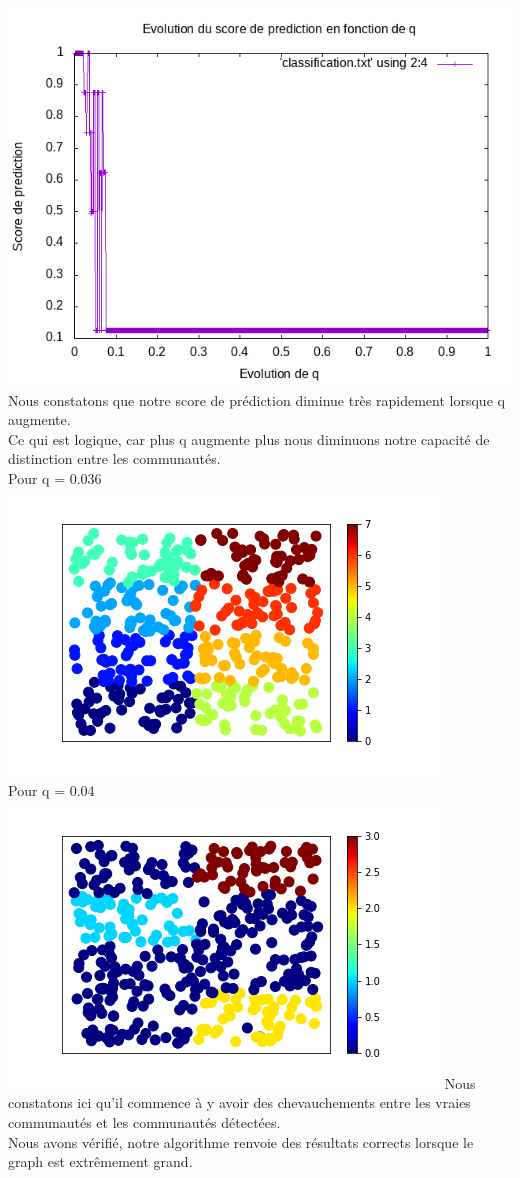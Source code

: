 \documentclass[a4paper,10pt]{report}
\begin{document}
 \includegraphics[scale=0.6]{Datas/classificationp05scorelabelpropagation.png}
Nous constatons que notre score de prédiction diminue très rapidement lorsque q augmente. 
\\
Ce qui est logique, car plus q augmente plus nous diminuons notre capacité de distinction entre les communautés.
\\
Pour q = 0.036
\\
\includegraphics[scale=0.6]{Datas/colorLabelPropagation036.png}
\\
Pour q = 0.04
\\
\includegraphics[scale=0.6]{Datas/colorLabelPropagation040.png}
Nous constatons ici qu'il commence à y avoir des chevauchements entre les vraies communautés et les communautés détectées.
\\
Nous avons vérifié, notre algorithme renvoie des résultats corrects lorsque le graph est extrêmement grand.
\end{document}
